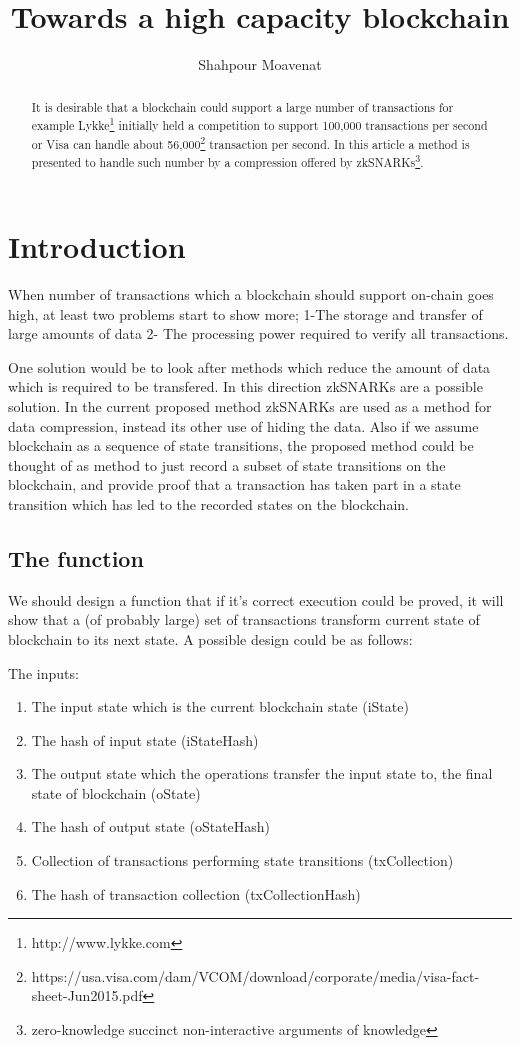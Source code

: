 \documentclass{article}
\title{Towards a high capacity blockchain}
\author{Shahpour Moavenat}
\affil{Lykke Corp}
\begin{document}
	
\maketitle
	
\begin{abstract}
	It is desirable that a blockchain could support a large number of transactions for example Lykke\footnote{http://www.lykke.com} initially held a competition to support 100,000 transactions per second or Visa can handle about 56,000\footnote{https://usa.visa.com/dam/VCOM/download/corporate/media/visa-fact-sheet-Jun2015.pdf} transaction per second.
	In this article a method is presented to handle such number by a compression offered by zkSNARKs\footnote{zero-knowledge succinct non-interactive arguments of knowledge}.
\end{abstract}

\section{Introduction}
When number of transactions which a blockchain should support on-chain goes high, at least two problems start to show more; 1-The storage and transfer of large amounts of data 2- The processing power required to verify all transactions.

One solution would be to look after methods which reduce the amount of data which is required to be transfered. In this direction zkSNARKs are a possible solution. In the current proposed method zkSNARKs are used as a method for data compression, instead its other use of hiding the data. Also if we assume blockchain as a sequence of state transitions, the proposed method could be thought of as method to just record a subset of state transitions on the blockchain, and provide proof that a transaction has taken part in a state transition which has led to the recorded states on the blockchain.

\subsection{The function}
We should design a function that if it's correct execution could be proved, it will show that a (of probably large) set of transactions transform current state of  blockchain to its next state. A possible design could be as follows:

The inputs:
\begin{enumerate}
\item The input state which is the current blockchain state (iState)
\item The hash of input state (iStateHash)
\item The output state which the operations transfer the input state to, the final state of blockchain (oState)
\item The hash of output state (oStateHash)
\item Collection of transactions performing state transitions (txCollection)
\item The hash of transaction collection (txCollectionHash)
\end{enumerate}
	
\end{document}
